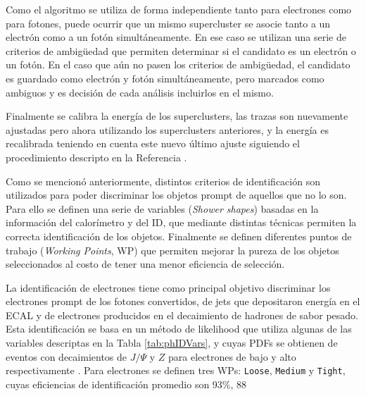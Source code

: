 Como el algoritmo se utiliza de forma independiente tanto para electrones como para fotones, puede ocurrir que un mismo supercluster se asocie tanto a un electrón como a un fotón simultáneamente. En ese caso se utilizan una serie de criterios de ambigüedad que permiten determinar si el candidato es un electrón o un fotón. En el caso que aún no pasen los criterios de ambigüedad, el candidato es guardado como electrón y fotón simultáneamente, pero marcados como ambiguos y es decisión de cada análisis incluirlos en el mismo. 




Finalmente se calibra la energía de los superclusters, las trazas son nuevamente ajustadas pero ahora utilizando los superclusters anteriores, y la energía es recalibrada teniendo en cuenta este nuevo último ajuste siguiendo el procedimiento descripto en la Referencia \cite{PERF-2017-03}.



Como se mencionó anteriormente, distintos criterios de identificación son utilizados para poder discriminar los objetos prompt
de aquellos que no lo son. Para ello se definen una serie de variables (\textit{Shower shapes}) basadas en la información del calorímetro y del ID, que mediante distintas técnicas permiten la correcta identificación de los objetos. Finalmente se definen diferentes puntos de trabajo (\textit{Working Points}, WP) que permiten mejorar la pureza de los objetos seleccionados al costo de tener una menor eficiencia de selección.

La identificación de electrones tiene como principal objetivo discriminar los electrones prompt de los fotones convertidos, de jets que depositaron energía en el ECAL y de electrones producidos en el decaimiento de hadrones de sabor pesado. Esta identificación se basa en un método de likelihood que utiliza algunas de las variables descriptas en la Tabla \ref{tab:phIDVars}, y cuyas PDFs se obtienen de eventos con decaimientos de $J/\Psi$ \cite{tesis_fer} y $Z$ para electrones de bajo y alto \ET respectivamente \cite{PERF-2016-01}. Para electrones se definen tres WPs: \texttt{Loose}, \texttt{Medium} y \texttt{Tight}, cuyas eficiencias de identificación promedio son  93\%, 88


